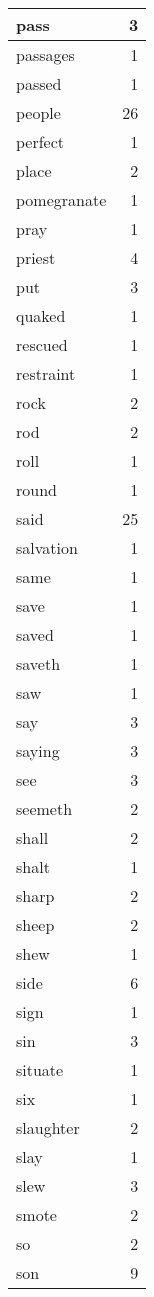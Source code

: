 \begin{center}
\begin{longtable}{l|r}
pass & 3 \\ \hline
passages & 1 \\ \hline
passed & 1 \\ \hline
people & 26 \\ \hline
perfect & 1 \\ \hline
place & 2 \\ \hline
pomegranate & 1 \\ \hline
pray & 1 \\ \hline
priest & 4 \\ \hline
put & 3 \\ \hline
quaked & 1 \\ \hline
rescued & 1 \\ \hline
restraint & 1 \\ \hline
rock & 2 \\ \hline
rod & 2 \\ \hline
roll & 1 \\ \hline
round & 1 \\ \hline
said & 25 \\ \hline
salvation & 1 \\ \hline
same & 1 \\ \hline
save & 1 \\ \hline
saved & 1 \\ \hline
saveth & 1 \\ \hline
saw & 1 \\ \hline
say & 3 \\ \hline
saying & 3 \\ \hline
see & 3 \\ \hline
seemeth & 2 \\ \hline
shall & 2 \\ \hline
shalt & 1 \\ \hline
sharp & 2 \\ \hline
sheep & 2 \\ \hline
shew & 1 \\ \hline
side & 6 \\ \hline
sign & 1 \\ \hline
sin & 3 \\ \hline
situate & 1 \\ \hline
six & 1 \\ \hline
slaughter & 2 \\ \hline
slay & 1 \\ \hline
slew & 3 \\ \hline
smote & 2 \\ \hline
so & 2 \\ \hline
son & 9 \\ \hline

\end{longtable}
\end{center}
